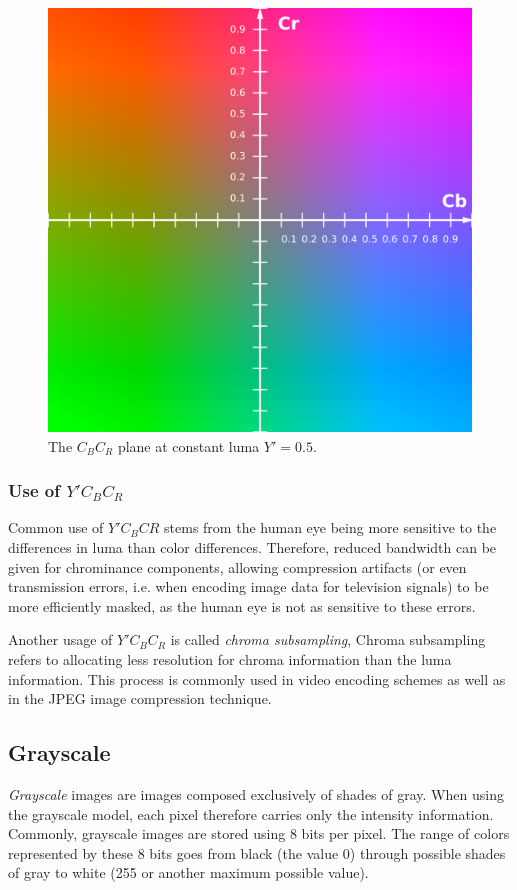 \documentclass[thesis=M,english]{FITthesis}[2012/10/20]
\begin{document}
\begin{figure}[h]
  \centering
  \includegraphics[scale=0.3]{imgs/ycbcr_plane}
  \caption{The $C_BC_R$ plane at constant luma $Y' = 0.5$.}
  \label{fig:ycbcr_plane}
\end{figure}

\subsubsection{Use of $Y'C_{B}C_{R}$}
Common use of $Y'C_{B}C{R}$ stems from the human eye being more sensitive to the
differences in luma than color differences. Therefore, reduced bandwidth can be
given for chrominance components, allowing compression artifacts (or even transmission
errors, i.e. when encoding image data for television signals) to be more efficiently
masked, as the human eye is not as sensitive to these errors.

Another usage of $Y'C_BC_R$ is called \emph{chroma subsampling}, Chroma subsampling
refers to allocating less resolution for chroma information than the luma information.
This process is commonly used in video encoding schemes as well as in the JPEG
image compression technique.\cite{img:chroma-subsample}

\subsection{Grayscale}
\emph{Grayscale} images are images composed exclusively of shades of gray.
When using the grayscale model, each pixel therefore carries only the intensity
information. Commonly, grayscale images are stored using 8 bits per pixel.
The range of colors represented by these 8 bits goes from black (the value 0)
through possible shades of gray to white (255 or another maximum possible value).
\end{document}
